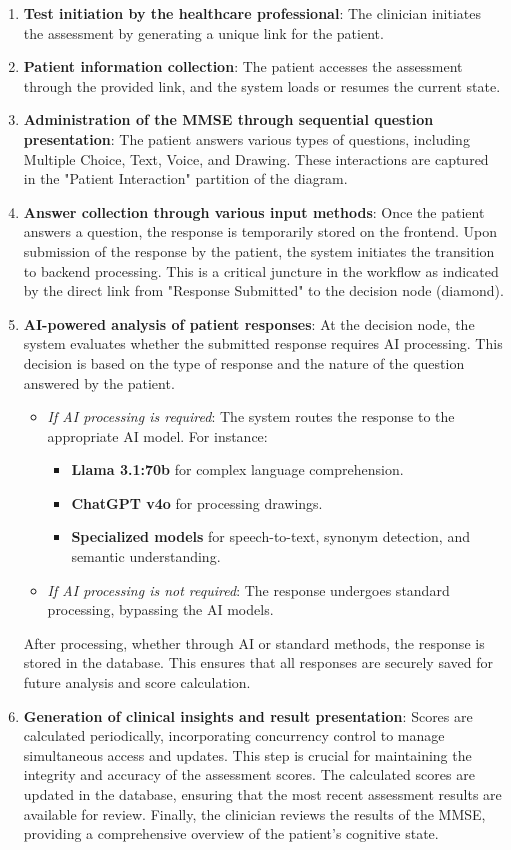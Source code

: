 \begin{enumerate}
    \item \textbf{Test initiation by the healthcare professional}: The clinician initiates the assessment by generating a unique link for the patient.
    \item \textbf{Patient information collection}: The patient accesses the assessment through the provided link, and the system loads or resumes the current state.
    \item \textbf{Administration of the MMSE through sequential question presentation}: The patient answers various types of questions, including Multiple Choice, Text, Voice, and Drawing. These interactions are captured in the "Patient Interaction" partition of the diagram.
    \item \textbf{Answer collection through various input methods}: Once the patient answers a question, the response is temporarily stored on the frontend. Upon submission of the response by the patient, the system initiates the transition to backend processing. This is a critical juncture in the workflow as indicated by the direct link from "Response Submitted" to the decision node (diamond).
    \item \textbf{AI-powered analysis of patient responses}: At the decision node, the system evaluates whether the submitted response requires AI processing. This decision is based on the type of response and the nature of the question answered by the patient.
    \begin{itemize}
        \item \textit{If AI processing is required}: The system routes the response to the appropriate AI model. For instance:
        \begin{itemize}
            \item \textbf{Llama 3.1:70b} for complex language comprehension.
            \item \textbf{ChatGPT v4o} for processing drawings.
            \item \textbf{Specialized models} for speech-to-text, synonym detection, and semantic understanding.
        \end{itemize}
        \item \textit{If AI processing is not required}: The response undergoes standard processing, bypassing the AI models.
    \end{itemize}
    After processing, whether through AI or standard methods, the response is stored in the database. This ensures that all responses are securely saved for future analysis and score calculation.
    \item \textbf{Generation of clinical insights and result presentation}: Scores are calculated periodically, incorporating concurrency control to manage simultaneous access and updates. This step is crucial for maintaining the integrity and accuracy of the assessment scores. The calculated scores are updated in the database, ensuring that the most recent assessment results are available for review. Finally, the clinician reviews the results of the MMSE, providing a comprehensive overview of the patient’s cognitive state.
\end{enumerate}



